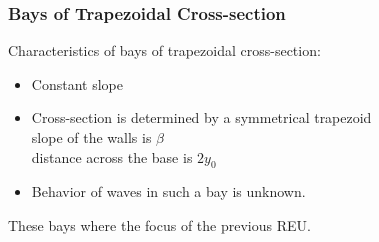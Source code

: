 
	\begin{frame}
		\frametitle{Bays of Trapezoidal Cross-section}
		Characteristics of bays of trapezoidal cross-section:
		\begin{itemize}
			\item Constant slope
			\item Cross-section is determined by a symmetrical trapezoid\\
			slope of the walls is $\beta$\\
			distance across the base is $2 y_0$
			\item Behavior of waves in such a bay is unknown. 
		\end{itemize}
		These bays where the focus of the previous REU.
	\end{frame}

